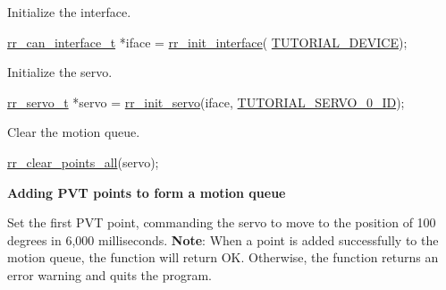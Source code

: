 \begin{DoxyEnumerate}
\item Initialize the interface. 
\begin{DoxyCodeInclude}
    \hyperlink{structrr__can__interface__t}{rr\_can\_interface\_t} *iface = \hyperlink{group___init_ga472a4890dcc7d7a13123c56a06946d91}{rr\_init\_interface}(
      \hyperlink{tutorial_8h_a90947332a0345dc693905e3fc04dbeb2}{TUTORIAL\_DEVICE});
\end{DoxyCodeInclude}

\item Initialize the servo. 
\begin{DoxyCodeInclude}
    \hyperlink{structrr__servo__t}{rr\_servo\_t} *servo = \hyperlink{group___init_ga0adb313a3eeb8a4399431e940a1f3e9e}{rr\_init\_servo}(iface, 
      \hyperlink{tutorial_8h_a9a3d33f25d3a72a8e30c885d238b3b65}{TUTORIAL\_SERVO\_0\_ID});
\end{DoxyCodeInclude}

\item Clear the motion queue. 
\begin{DoxyCodeInclude}
    \hyperlink{group___trajectory_ga19472cd90ae91f9b9f49edf4f52f35a2}{rr\_clear\_points\_all}(servo);
\end{DoxyCodeInclude}
 {\bfseries  Adding P\+VT points to form a motion queue }
\item Set the first P\+VT point, commanding the servo to move to the position of 100 degrees in 6,000 milliseconds. {\bfseries Note}\+: When a point is added successfully to the motion queue, the function will return OK. Otherwise, the function returns an error warning and quits the program. 


\end{DoxyEnumerate}
